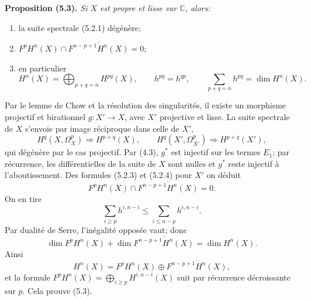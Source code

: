 \documentclass[11pt]{article}
\newcommand{\C}{\mathbb C}
\newenvironment{named}[1]{\par\medskip\noindent\textbf{#1}\itshape}{\par\medskip}
\begin{document}
\begin{named}{Proposition (5.3).}
Si $X$ est propre et lisse sur $\C$, alors:
\begin{enumerate}[label=(\roman*)]
\item la suite spectrale (5.2.1) dégénère;
\item $F^pH^n(X)\cap\overline{F^{n-p+1}H^n(X)}=0$;
\item en particulier
\[
H^n(X)=\bigoplus_{p+q=n}H^{pq}(X),\qquad h^{pq}=h^{qp},\qquad \sum_{p+q=n}h^{pq}=\dim H^n(X).
\]
\end{enumerate}
\end{named}
Par le lemme de Chow et la résolution des singularités, il existe un morphisme projectif et birationnel $g:X'\to X$, avec $X'$ projective et lisse. La suite spectrale de $X$ s'envoie par image réciproque dans celle de $X'$,
\[
H^q(X,\Omega^p_X)\Longrightarrow H^{p+q}(X),\qquad
H^q(X',\Omega^p_{X'})\Longrightarrow H^{p+q}(X'),
\]
qui dégénère par le cas projectif. Par (4.3), $g^*$ est injectif sur les termes $E_1$; par récurrence, les différentielles de la suite de $X$ sont nulles et $g^*$ reste injectif à l'aboutissement. Des formules (5.2.3) et (5.2.4) pour $X'$ on déduit
\begin{equation}\tag{5.3.6}
F^pH^n(X)\cap \overline{F^{n-p+1}H^n(X)}=0.
\end{equation}
On en tire
\begin{equation}\tag{5.3.7}
\sum_{i\ge p}h^{i,n-i}\le \sum_{i\le n-p}h^{i,n-i}.
\end{equation}
Par dualité de Serre, l'inégalité opposée vaut; donc
\[
\dim F^pH^n(X)+\dim\overline{F^{n-p+1}H^n(X)}=\dim H^n(X).
\]
Ainsi
\begin{equation}\tag{5.3.8}
H^n(X)=F^pH^n(X)\oplus\overline{F^{n-p+1}H^n(X)},
\end{equation}
et la formule $F^pH^n(X)=\bigoplus_{i\ge p}H^{i,n-i}(X)$ suit par récurrence décroissante sur $p$. Cela prouve (5.3).
\end{document}
